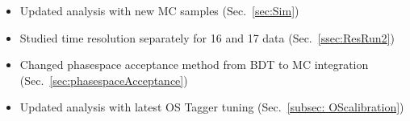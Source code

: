 \begin{itemize}
\begin{itemize}
		\item Updated analysis with new MC samples   (Sec.~\ref{sec:Sim})
	
		\item Studied time resolution separately for 16 and 17 data (Sec.~\ref{ssec:ResRun2}) 		
		
		\item Changed phasespace acceptance method from BDT to MC integration (Sec.~\ref{sec:phasespaceAcceptance}) 

		\item Updated analysis with latest OS Tagger tuning   (Sec.~\ref{subsec: OScalibration}) 		
		
	\end{itemize}

\end{itemize}
